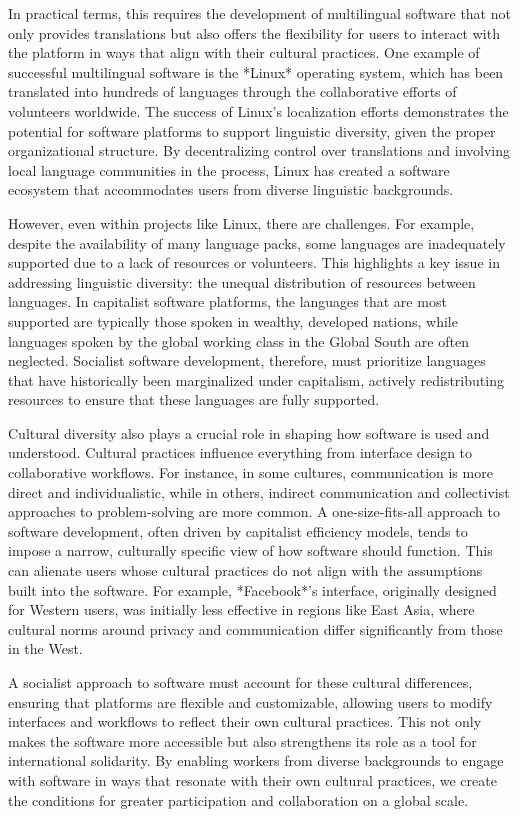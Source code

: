\begin{refsection}
In practical terms, this requires the development of multilingual software that not only provides translations but also offers the flexibility for users to interact with the platform in ways that align with their cultural practices. One example of successful multilingual software is the *Linux* operating system, which has been translated into hundreds of languages through the collaborative efforts of volunteers worldwide. The success of Linux’s localization efforts demonstrates the potential for software platforms to support linguistic diversity, given the proper organizational structure. By decentralizing control over translations and involving local language communities in the process, Linux has created a software ecosystem that accommodates users from diverse linguistic backgrounds.

However, even within projects like Linux, there are challenges. For example, despite the availability of many language packs, some languages are inadequately supported due to a lack of resources or volunteers. This highlights a key issue in addressing linguistic diversity: the unequal distribution of resources between languages. In capitalist software platforms, the languages that are most supported are typically those spoken in wealthy, developed nations, while languages spoken by the global working class in the Global South are often neglected. Socialist software development, therefore, must prioritize languages that have historically been marginalized under capitalism, actively redistributing resources to ensure that these languages are fully supported.

Cultural diversity also plays a crucial role in shaping how software is used and understood. Cultural practices influence everything from interface design to collaborative workflows. For instance, in some cultures, communication is more direct and individualistic, while in others, indirect communication and collectivist approaches to problem-solving are more common. A one-size-fits-all approach to software development, often driven by capitalist efficiency models, tends to impose a narrow, culturally specific view of how software should function. This can alienate users whose cultural practices do not align with the assumptions built into the software. For example, *Facebook*’s interface, originally designed for Western users, was initially less effective in regions like East Asia, where cultural norms around privacy and communication differ significantly from those in the West.

A socialist approach to software must account for these cultural differences, ensuring that platforms are flexible and customizable, allowing users to modify interfaces and workflows to reflect their own cultural practices. This not only makes the software more accessible but also strengthens its role as a tool for international solidarity. By enabling workers from diverse backgrounds to engage with software in ways that resonate with their own cultural practices, we create the conditions for greater participation and collaboration on a global scale.


\end{refsection}
